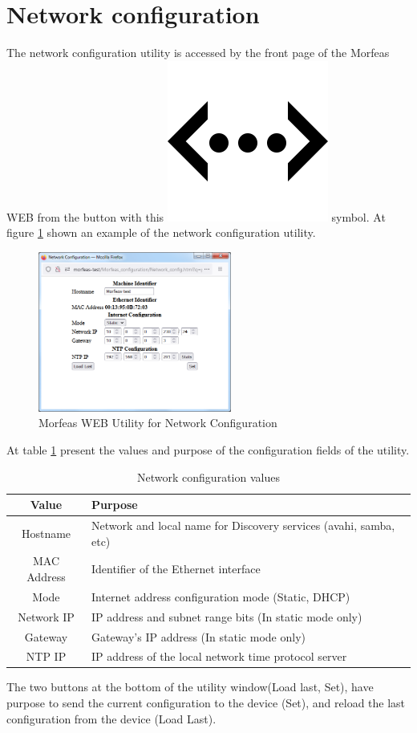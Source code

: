 \section{Network configuration}
The network configuration utility is accessed by the front page of the Morfeas WEB from the button with
this \includegraphics[height=.125in]{../art/eth.png} symbol.
At figure \ref{fig:net_conf} shown an example of the network configuration utility.
\begin{figure}[h]
\centering
	\includegraphics[width=2.5in,angle=0]{../art/Morfeas_web_if/network_config.png}
	\caption{Morfeas WEB Utility for Network Configuration}
	\label{fig:net_conf}
\end{figure}

At table \ref{tab:net_conf} present the values and purpose of the configuration fields of the utility.
\begin{table}[h!]
	\begin{center}
		\begin{tabular}{|c|l|}
			\hline
			\textbf{Value} & \textbf{Purpose}\\
			\hline
			Hostname & Network and local name for Discovery services (avahi, samba, etc)\\
			\hline
			MAC Address & Identifier of the Ethernet interface\\
			\hline
			Mode & Internet address configuration mode (Static, DHCP)\\
			\hline
			Network IP & IP address and subnet range bits (In static mode only)\\
			Gateway & Gateway's IP address (In static mode only)\\
			\hline
			NTP IP & IP address of the local network time protocol server\\
			\hline
		\end{tabular}
		\caption{Network configuration values}
		\label{tab:net_conf}
	\end{center}
\end{table}

The two buttons at the bottom of the utility window(Load last, Set),
have purpose to send the current configuration to the device (Set),
and reload the last configuration from the device (Load Last).